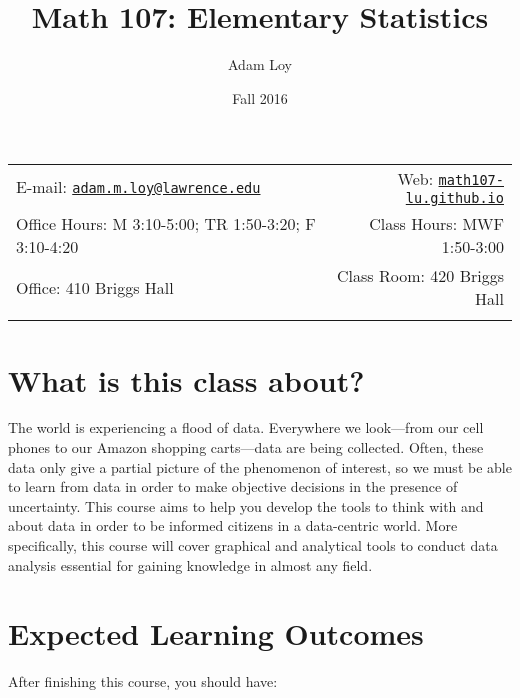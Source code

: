 \documentclass[11pt,]{article}
\title{Math 107: Elementary Statistics}
\author{Adam Loy}
\date{Fall 2016}
\begin{document}
  

		\maketitle
		
	
		\thispagestyle{firststyle}



	\noindent \begin{tabular*}{\textwidth}{ @{\extracolsep{\fill}} lr @{\extracolsep{\fill}}}


E-mail: \texttt{\href{mailto:adam.m.loy@lawrence.edu}{\nolinkurl{adam.m.loy@lawrence.edu}}} & Web: \href{http://math107-lu.github.io}{\tt math107-lu.github.io}\\
Office Hours: M 3:10-5:00; TR 1:50-3:20; F 3:10-4:20  &  Class Hours: MWF 1:50-3:00\\
Office: 410 Briggs Hall  & Class Room: 420 Briggs Hall\\
	&  \\
	\hline
	\end{tabular*}
	
\vspace{2mm}
	


\section{What is this class about?}\label{what-is-this-class-about}

The world is experiencing a flood of data. Everywhere we look---from our
cell phones to our Amazon shopping carts---data are being collected.
Often, these data only give a partial picture of the phenomenon of
interest, so we must be able to learn from data in order to make
objective decisions in the presence of uncertainty. This course aims to
help you develop the tools to think with and about data in order to be
informed citizens in a data-centric world. More specifically, this
course will cover graphical and analytical tools to conduct data
analysis essential for gaining knowledge in almost any field.

\section{Expected Learning Outcomes}\label{expected-learning-outcomes}

After finishing this course, you should have:
\end{document}
